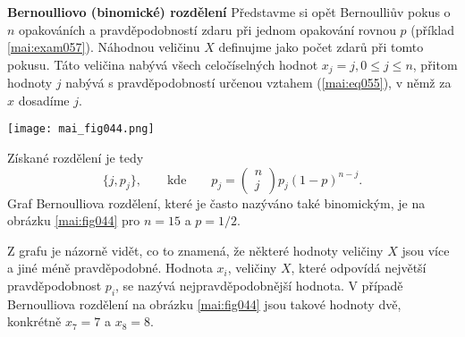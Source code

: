 \wikitextrule
\begin{example}\label{mai:exam065}
  \textbf{Bernoulliovo (binomické) rozdělení}\newline\small
  Představme si opět Bernoulliův pokus o \(n\) opakováních a pravděpodobností zdaru při jednom 
  opakování rovnou \(p\) (příklad \ref{mai:exam057}). Náhodnou veličinu \(X\) definujme jako počet 
  zdarů při tomto pokusu. Táto veličina nabývá všech celočíselných hodnot \(x_j = j, 0 \leq j \leq 
  n\), přitom hodnoty \(j\) nabývá s pravděpodobností určenou vztahem (\ref{mai:eq055}), v němž za 
  \(x\) dosadíme \(j\). 
  
  {\centering
   \captionsetup{type=figure}
   \texttt{[image: mai\_fig044.png]}
  \par}
  
  Získané rozdělení je tedy
  \begin{equation*}
    \lbrace j,p_j\rbrace, \qquad\text{kde}\qquad p_j = 
      \begin{pmatrix} n \\ j \end{pmatrix}p_j(1 - p)^{n-j}.
  \end{equation*}
  Graf Bernoulliova rozdělení, které je často nazýváno také binomickým, je na obrázku 
  \ref{mai:fig044} pro \(n = 15\) a \(p = 1/2\).
  
  Z grafu je názorně vidět, co to znamená, že některé hodnoty veličiny \(X\) jsou více a jiné méně 
  pravděpodobné. Hodnota \(x_i\), veličiny \(X\), které odpovídá největší pravděpodobnost \(p_i\), 
  se nazývá nejpravděpodobnější hodnota. V případě Bernoulliova rozdělení na obrázku 
  \ref{mai:fig044} jsou takové hodnoty dvě, konkrétně \(x_7 = 7\) a \(x_8 = 8\).
\normalsize
\end{example}